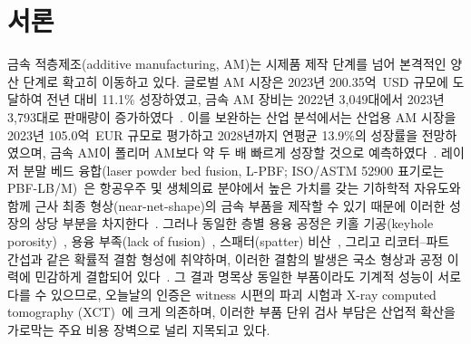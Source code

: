 
\section{서론}
\label{sec:intro}

금속 적층제조(additive manufacturing, AM)는 시제품 제작 단계를 넘어 본격적인
양산 단계로 확고히 이동하고 있다. 글로벌 AM 시장은 2023년 200.35억~USD 규모에
도달하여 전년 대비 11.1\% 성장하였고, 금속 AM 장비는 2022년 3{,}049대에서
2023년 3{,}793대로 판매량이 증가하였다~\cite{Wohlers2024}. 이를 보완하는 산업
분석에서는 산업용 AM 시장을 2023년 105.0억~EUR 규모로 평가하고 2028년까지
연평균 13.9\%의 성장률을 전망하였으며, 금속 AM이 폴리머 AM보다 약 두 배
빠르게 성장할 것으로 예측하였다~\cite{AMPOWER2024}. 레이저 분말 베드
융합(laser powder bed fusion, L-PBF; ISO/ASTM 52900 표기로는
PBF-LB/M)~\cite{ISO52900,Gibson2021AMTech,King2015LPBF}은
항공우주 및 생체의료 분야에서 높은 가치를 갖는 기하학적 자유도와 함께
근사 최종 형상(near-net-shape)의 금속 부품을 제작할 수 있기 때문에 이러한
성장의 상당 부분을 차지한다~\cite{BlakeyMilner2021Aerospace,Bose2018Biomaterials}.
그러나 동일한 층별 용융 공정은 키홀 기공(keyhole
porosity)~\cite{King2014Keyhole}, 용융 부족(lack of
fusion)~\cite{Tang2017LOF}, 스패터(spatter) 비산~\cite{Ly2017Spatter}, 그리고
리코터--파트 간섭과 같은 확률적 결함 형성에 취약하며, 이러한 결함의 발생은
국소 형상과 공정 이력에 민감하게 결합되어
있다~\cite{Sames2016Metallurgy,DebRoy2018PMS}. 그 결과 명목상 동일한 부품이라도
기계적 성능이 서로 다를 수 있으므로, 오늘날의 인증은 witness 시편의 파괴
시험과 X-ray computed tomography
(XCT)~\cite{Seifi2016Qualification,Seifi2017Standardization,duPlessis2018XCT}에
크게 의존하며, 이러한 부품 단위 검사 부담은 산업적 확산을 가로막는 주요 비용
장벽으로 널리 지목되고 있다.

